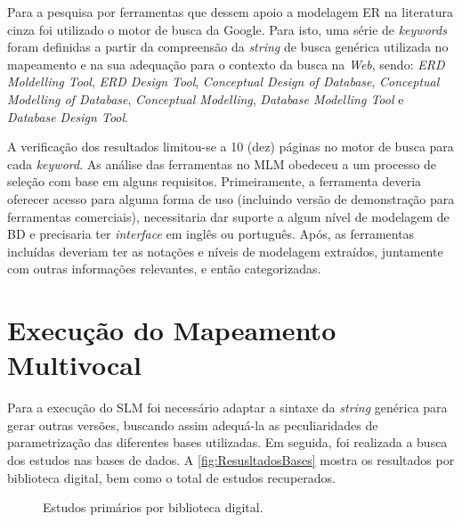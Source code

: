 Para a pesquisa por ferramentas que dessem apoio a modelagem ER na literatura cinza foi utilizado o motor de busca da Google. 
Para isto, uma série de \textit{keywords} foram definidas a partir da compreensão da \textit{string} de busca genérica utilizada no mapeamento e na sua adequação para o contexto da busca na \textit{Web}, sendo:
\textit{ERD Moldelling Tool}, \textit{ERD Design Tool}, \textit{Conceptual Design of Database}, \textit{Conceptual Modelling of Database}, \textit{Conceptual Modelling}, \textit{Database Modelling Tool} e \textit{Database Design Tool}.


A verificação dos resultados limitou-se a 10 (dez) páginas no motor de busca para cada \textit{keyword}. 
As análise das ferramentas no \ac{MLM} obedeceu a um processo de seleção com base em alguns requisitos.
Primeiramente, a ferramenta deveria oferecer acesso para alguma forma de uso (incluindo versão de demonstração para ferramentas comerciais), necessitaria dar suporte a algum nível de modelagem de \ac{BD} e precisaria ter \textit{interface} em inglês ou português. 
Após, as ferramentas incluídas deveriam ter as notações e níveis de modelagem extraídos, juntamente com outras informações relevantes, e então categorizadas.

\section{Execução do Mapeamento Multivocal} \label{sec:ExecMapeamento}

Para a execução do \ac{SLM} foi necessário adaptar a sintaxe da \textit{string} genérica para gerar outras versões, buscando assim adequá-la as peculiaridades de parametrização das diferentes bases utilizadas. 
Em seguida, foi realizada a busca dos estudos nas bases de dados. 
A \autoref{fig:ResusltadosBases} mostra os resultados por biblioteca digital, bem como o total de estudos recuperados.

\begin{figure}[!htb]
	\centering
	    \caption{Estudos primários por biblioteca digital.}
        
	\label{fig:ResusltadosBases}
\end{figure}

